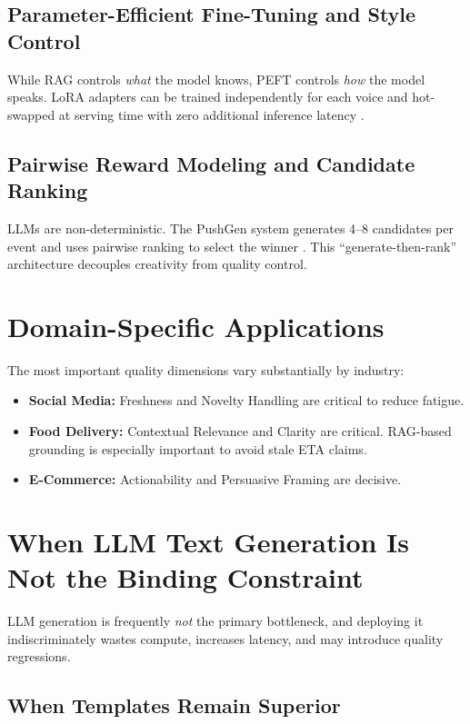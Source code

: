 \documentclass[11pt]{article}
\begin{document}
\subsection{Parameter-Efficient Fine-Tuning and Style Control}

While RAG controls \textit{what} the model knows, PEFT controls \textit{how} the model speaks. LoRA \citep{hu2022lora} adapters can be trained independently for each voice and hot-swapped at serving time with zero additional inference latency \citep{han2024parameter}.

\subsection{Pairwise Reward Modeling and Candidate Ranking}

LLMs are non-deterministic. The PushGen system generates 4--8 candidates per event and uses pairwise ranking to select the winner \citep{bie2026pushgen}. This ``generate-then-rank'' architecture decouples creativity from quality control.

\section{Domain-Specific Applications}

The most important quality dimensions vary substantially by industry:
\begin{itemize}
    \item \textbf{Social Media:} Freshness and Novelty Handling are critical to reduce fatigue.
    \item \textbf{Food Delivery:} Contextual Relevance and Clarity are critical. RAG-based grounding is especially important to avoid stale ETA claims.
    \item \textbf{E-Commerce:} Actionability and Persuasive Framing are decisive.
\end{itemize}

\section{When LLM Text Generation Is Not the Binding Constraint}

LLM generation is frequently \textit{not} the primary bottleneck, and deploying it indiscriminately wastes compute, increases latency, and may introduce quality regressions.

\subsection{When Templates Remain Superior}
\end{document}
